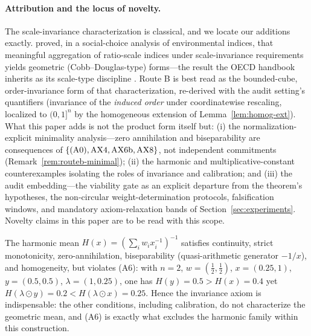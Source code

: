 \paragraph{Attribution and the locus of novelty.}
The scale-invariance characterization is classical, and we locate our
additions exactly. \citet{ebert_welsch2004} proved, in a social-choice
analysis of environmental indices, that meaningful aggregation of ratio-scale
indices under scale-invariance requirements yields geometric
(Cobb--Douglas-type) forms---the result the OECD handbook inherits as its
scale-type discipline \citep{oecd2008}. Route B is best read as the
bounded-cube, order-invariance form of that characterization, re-derived
with the audit setting's quantifiers (invariance of the \emph{induced order}
under coordinatewise rescaling, localized to $(0,1]^n$ by the homogeneous
extension of Lemma~\ref{lem:homog-ext}). What this paper adds is not the
product form itself but: (i) the normalization-explicit minimality
analysis---zero annihilation and biseparability are consequences of
$\{\textup{(A0)},\textup{AX4},\textup{AX6b},\textup{AX8}\}$, not independent
commitments (Remark~\ref{rem:routeb-minimal}); (ii) the harmonic and
multiplicative-constant counterexamples isolating the roles of invariance
and calibration; and (iii) the audit embedding---the viability gate as an
explicit departure from the theorem's hypotheses, the non-circular
weight-determination protocols, falsification windows, and mandatory
axiom-relaxation bands of Section~\ref{sec:experiments}. Novelty claims in
this paper are to be read with this scope.

\begin{proposition}\label{prop:harmonic}
The harmonic mean $H(x)=(\sum_i w_i x_i^{-1})^{-1}$ satisfies continuity,
strict monotonicity, zero-annihilation, biseparability (quasi-arithmetic
generator $-1/x$), and homogeneity, but violates \textup{(A6)}: with
$n=2$, $w=(\tfrac12,\tfrac12)$, $x=(0.25,1)$, $y=(0.5,0.5)$,
$\lambda=(1,0.25)$, one has $H(y)=0.5>H(x)=0.4$ yet
$H(\lambda\odot y)=0.2<H(\lambda\odot x)=0.25$. Hence the invariance axiom
is indispensable: the other conditions, including calibration, do not
characterize the geometric mean, and (A6) is exactly what excludes the
harmonic family within this construction.
\end{proposition}

